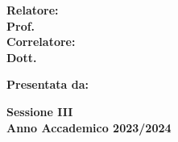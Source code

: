 \begin{titlepage}
    \vspace{20mm} %
    \par
    \noindent
    \begin{minipage}[t]{0.47\textwidth}
        {\large{\textbf{Relatore:}}} \\
        {\large{\textbf{Prof. \xsupervisor}}}
        \vspace{5mm}
        {\large{\bf \\Correlatore:\\
        Dott. \xcorrelatore}}
    \end{minipage}
    \hfill
    \begin{minipage}[t]{0.47\textwidth}\raggedleft
        {\large{\textbf{Presentata da:} \\
        {\large{\textbf{\xstudent}}}}}
    \end{minipage}


    \vspace{1cm}

    \begin{center}
        {\large{\textbf{Sessione III\\Anno Accademico 2023/2024}}}
    \end{center}
\end{titlepage}
